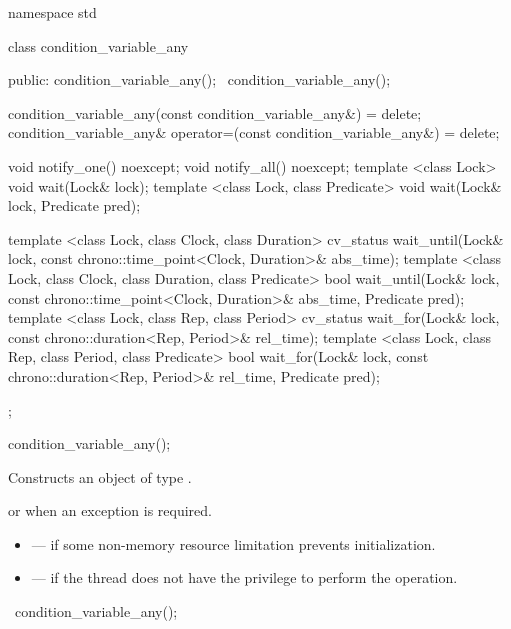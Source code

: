 %
\begin{codeblock}
namespace std {
  class condition_variable_any {
  public:
    condition_variable_any();
    ~condition_variable_any();

    condition_variable_any(const condition_variable_any&) = delete;
    condition_variable_any& operator=(const condition_variable_any&) = delete;

    void notify_one() noexcept;
    void notify_all() noexcept;
    template <class Lock>
      void wait(Lock& lock);
    template <class Lock, class Predicate>
      void wait(Lock& lock, Predicate pred);

    template <class Lock, class Clock, class Duration>
      cv_status wait_until(Lock& lock, const chrono::time_point<Clock, Duration>& abs_time);
    template <class Lock, class Clock, class Duration, class Predicate>
      bool wait_until(Lock& lock, const chrono::time_point<Clock, Duration>& abs_time,
        Predicate pred);
    template <class Lock, class Rep, class Period>
      cv_status wait_for(Lock& lock, const chrono::duration<Rep, Period>& rel_time);
    template <class Lock, class Rep, class Period, class Predicate>
      bool wait_for(Lock& lock, const chrono::duration<Rep, Period>& rel_time,
        Predicate pred);
  };
}
\end{codeblock}

%
\begin{itemdecl}
condition_variable_any();
\end{itemdecl}

\begin{itemdescr}
\pnum
\effects Constructs an object of type .

\pnum
\throws {} or  when an exception is
required.

\pnum
\errors
\begin{itemize}
\item {} --- if some non-memory resource
limitation prevents initialization.

\item {} --- if the thread does not have the
privilege to perform the operation.
\end{itemize}
\end{itemdescr}

%
\begin{itemdecl}
~condition_variable_any();
\end{itemdecl}

